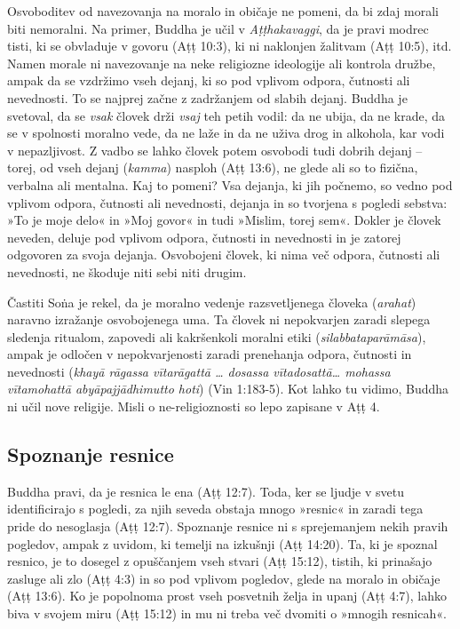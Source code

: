 Osvoboditev od navezovanja na moralo in običaje ne pomeni, da bi zdaj
morali biti nemoralni. Na primer, Buddha je učil v \emph{Aṭṭhakavaggi},
da je pravi modrec tisti, ki se obvladuje v govoru (Aṭṭ 10:3), ki ni
naklonjen žalitvam (Aṭṭ 10:5), itd. Namen morale ni navezovanje na neke
religiozne ideologije ali kontrola družbe, ampak da se vzdržimo vseh
dejanj, ki so pod vplivom odpora, čutnosti ali nevednosti. To se najprej
začne z zadržanjem od slabih dejanj. Buddha je svetoval, da se
\emph{vsak} človek drži \emph{vsaj} teh petih vodil: da ne ubija, da ne
krade, da se v spolnosti moralno vede, da ne laže in da ne uživa drog in
alkohola, kar vodi v nepazljivost. Z vadbo se lahko človek potem
osvobodi tudi dobrih dejanj -- torej, od vseh dejanj (\emph{kamma})
nasploh (Aṭṭ 13:6), ne glede ali so to fizična, verbalna ali mentalna.
Kaj to pomeni? Vsa dejanja, ki jih počnemo, so vedno pod vplivom odpora,
čutnosti ali nevednosti, dejanja in so tvorjena s pogledi sebstva: »To
je moje delo« in »Moj govor« in tudi »Mislim, torej sem«. Dokler je
človek neveden, deluje pod vplivom odpora, čutnosti in nevednosti in je
zatorej odgovoren za svoja dejanja. Osvobojeni človek, ki nima več
odpora, čutnosti ali nevednosti, ne škoduje niti sebi niti drugim.

Častiti Soṅa je rekel, da je moralno vedenje razsvetljenega človeka
(\emph{arahat}) naravno izražanje osvobojenega uma. Ta človek ni
nepokvarjen zaradi slepega sledenja ritualom, zapovedi ali kakršenkoli
moralni etiki (\emph{silabbataparāmāsa}), ampak je odločen v
nepokvarjenosti zaradi prenehanja odpora, čutnosti in nevednosti
(\emph{khayā rāgassa vītarāgattā \ldots{} dosassa vītadosattā\ldots{}
mohassa vītamohattā abyāpajjādhimutto hoti}) (Vin 1:183-5). Kot lahko tu
vidimo, Buddha ni učil nove religije. Misli o ne-religioznosti so lepo
zapisane v Aṭṭ 4.

\subsection{Spoznanje resnice}

Buddha pravi, da je resnica le ena
(Aṭṭ 12:7). Toda, ker se ljudje v svetu identificirajo s pogledi, za
njih seveda obstaja mnogo »resnic« in zaradi tega pride do nesoglasja
(Aṭṭ 12:7). Spoznanje resnice ni s sprejemanjem nekih pravih pogledov,
ampak z uvidom, ki temelji na izkušnji (Aṭṭ 14:20). Ta, ki je spoznal
resnico, je to dosegel z opuščanjem vseh stvari (Aṭṭ 15:12), tistih, ki
prinašajo zasluge ali zlo (Aṭṭ 4:3) in so pod vplivom pogledov, glede na
moralo in običaje (Aṭṭ 13:6). Ko je popolnoma prost vseh posvetnih želja
in upanj (Aṭṭ 4:7), lahko biva v svojem miru (Aṭṭ 15:12) in mu ni treba
več dvomiti o »mnogih resnicah«.


